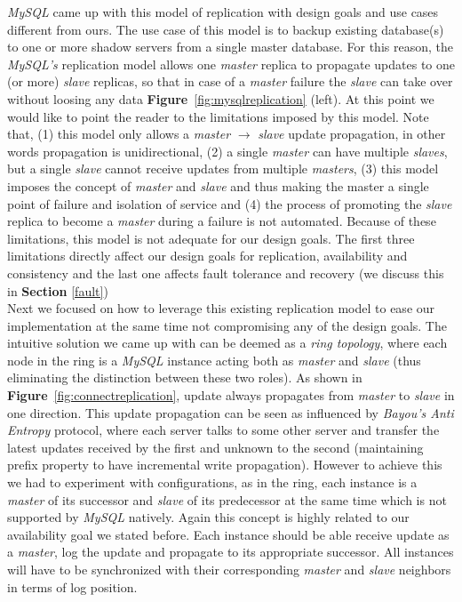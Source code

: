 \documentclass[12pt]{article}
\begin{document}
\emph{MySQL} came up with this model of replication with design goals and use cases different from ours. The use case of this model is to backup existing database(s) to one or more shadow servers from a single master database. For this reason, the \emph{MySQL's} replication model allows one \emph{master} replica to propagate updates to one (or more) \emph{slave} replicas, so that in case of a \emph{master} failure the \emph{slave} can take over without loosing any data \textbf{Figure}~\ref{fig:mysqlreplication} (left). At this point we would like to point the reader to the limitations imposed by this model. Note that,  (1) this model only allows a \emph{master} $\rightarrow$ \emph{slave} update propagation, in other words propagation is unidirectional, (2) a single \emph{master} can have multiple \emph{slaves}, but a single \emph{slave} cannot receive updates from multiple \emph{masters}, (3) this model imposes the concept of \emph{master} and \emph{slave} and thus making the master a single point of failure and isolation of service and (4) the process of promoting the \emph{slave} replica to become a \emph{master} during a failure is not automated. Because of these limitations, this model is not adequate for our design goals. The first three limitations directly affect our design goals for replication, availability and consistency and the last one affects fault tolerance and recovery (we discuss this in \textbf{Section} \ref{fault})\\
Next we focused on how to leverage this existing replication model to ease our implementation at the same time not compromising any of the design goals. The intuitive  solution we came up with can be deemed as a \emph{ring topology}, where each node in the ring is a \emph{MySQL} instance acting both as \emph{master} and \emph{slave} (thus eliminating the distinction between these two roles). As shown in \textbf{Figure}~\ref{fig:connectreplication}, update always propagates from \emph{master} to \emph{slave} in one direction. This update propagation can be seen as influenced by \emph{Bayou's Anti Entropy} protocol, where each server talks to some other server and transfer the latest updates received by the first and unknown to the second (maintaining prefix property to have incremental write propagation). However to achieve this we had to experiment with configurations, as in the ring, each instance is a \emph{master} of its successor and \emph{slave} of its predecessor at the same time which is not supported by \emph{MySQL} natively. Again this concept is highly related to our availability goal we stated before. Each instance should be able receive update as a \emph{master}, log the update and propagate to its appropriate successor. All instances will have to be synchronized with their corresponding \emph{master} and \emph{slave} neighbors in terms of log position. 
\end{document}
